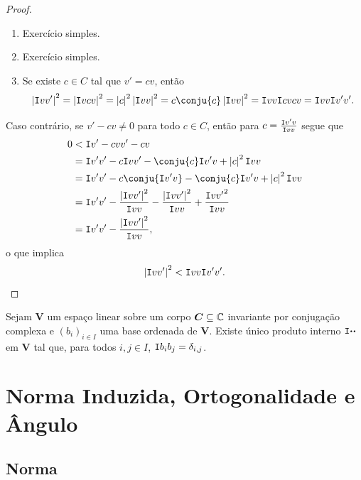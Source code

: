\begin{proof}
	\begin{enumerate}
	\item Exercício simples.
	\item Exercício simples.
	\item Se existe $c \in C$ tal que $v'=cv$, então
		\begin{equation*}
		\abs{\inte{v}{v'}}^2 =\abs{\inte{v}{cv}}^2 = \abs{c}^2\abs{\inte{v}{v}}^2 = c\conju{c}\abs{\inte{v}{v}}^2 = \inte{v}{v}\inte{cv}{cv} = \inte{v}{v}\inte{v'}{v'}.
		\end{equation*}
	\end{enumerate}

Caso contrário, se $v'-cv \neq 0$ para todo $c \in C$, então para $c=\frac{\mathtt I{v'}{v}}{\mathtt I{v}{v}}$ segue que
	\begin{align*}
	0 &< \inte{v'-cv}{v'-cv} \\
		&= \inte{v'}{v'} - c\inte{v}{v'} - \conju{c}\inte{v'}{v} + \abs{c}^2\inte{v}{v} \\
		&= \inte{v'}{v'} - c\conju{\inte{v'}{v}} - \conju{c}\inte{v'}{v} + \abs{c}^2\inte{v}{v} \\
		&= \inte{v'}{v'} - \frac{\abs{\inte{v}{v'}}^2}{\inte{v}{v}} - \frac{\abs{\inte{v}{v'}}^2}{\inte{v}{v}} + \frac{\inte{v}{v'}^2}{\inte{v}{v}} \\
		&=  \inte{v'}{v'} - \frac{\abs{\inte{v}{v'}}^2}{\inte{v}{v}},
	\end{align*}
o que implica
	\begin{equation*}
	\left\vert{\mathtt I{v}{v'}}\right\vert^2 < \mathtt I{v}{v}\mathtt I{v'}{v'}.
	\end{equation*}
\end{proof}

\begin{prop}
Sejam $\bm V$ um espaço linear sobre um corpo $\bm C \subseteq \mathbb{C}$ invariante por conjugação complexa e $(b_i)_{i \in I}$ uma base ordenada de $\bm V$. Existe único produto interno $\mathtt I{\bm{\cdot}}{\bm{\cdot}}$ em $\bm V$ tal que, para todos $i,j \in I$, $\mathtt I{b_i}{b_j}=\delta_{i,j}$.
\end{prop}

\section{Norma Induzida, Ortogonalidade e Ângulo}

\subsection{Norma}

